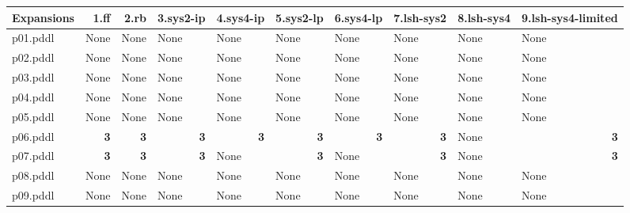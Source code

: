 \documentclass{article}
\begin{document}
\begin{tabular}{@{}lrrrrrrrrr@{}}
Expansions & 1.ff & 2.rb & 3.sys2-ip & 4.sys4-ip & 5.sys2-lp & 6.sys4-lp & 7.lsh-sys2 & 8.lsh-sys4 & 9.lsh-sys4-limited \\
\midrule
p01.pddl & \multicolumn{1}{|l|}{None} & \multicolumn{1}{|l|}{None} & \multicolumn{1}{|l|}{None} & \multicolumn{1}{|l|}{None} & \multicolumn{1}{|l|}{None} & \multicolumn{1}{|l|}{None} & \multicolumn{1}{|l|}{None} & \multicolumn{1}{|l|}{None} & \multicolumn{1}{|l|}{None} \\
p02.pddl & \multicolumn{1}{|l|}{None} & \multicolumn{1}{|l|}{None} & \multicolumn{1}{|l|}{None} & \multicolumn{1}{|l|}{None} & \multicolumn{1}{|l|}{None} & \multicolumn{1}{|l|}{None} & \multicolumn{1}{|l|}{None} & \multicolumn{1}{|l|}{None} & \multicolumn{1}{|l|}{None} \\
p03.pddl & \multicolumn{1}{|l|}{None} & \multicolumn{1}{|l|}{None} & \multicolumn{1}{|l|}{None} & \multicolumn{1}{|l|}{None} & \multicolumn{1}{|l|}{None} & \multicolumn{1}{|l|}{None} & \multicolumn{1}{|l|}{None} & \multicolumn{1}{|l|}{None} & \multicolumn{1}{|l|}{None} \\
p04.pddl & \multicolumn{1}{|l|}{None} & \multicolumn{1}{|l|}{None} & \multicolumn{1}{|l|}{None} & \multicolumn{1}{|l|}{None} & \multicolumn{1}{|l|}{None} & \multicolumn{1}{|l|}{None} & \multicolumn{1}{|l|}{None} & \multicolumn{1}{|l|}{None} & \multicolumn{1}{|l|}{None} \\
p05.pddl & \multicolumn{1}{|l|}{None} & \multicolumn{1}{|l|}{None} & \multicolumn{1}{|l|}{None} & \multicolumn{1}{|l|}{None} & \multicolumn{1}{|l|}{None} & \multicolumn{1}{|l|}{None} & \multicolumn{1}{|l|}{None} & \multicolumn{1}{|l|}{None} & \multicolumn{1}{|l|}{None} \\
p06.pddl & \textbf{3} & \textbf{3} & \textbf{3} & \textbf{3} & \textbf{3} & \textbf{3} & \textbf{3} & \multicolumn{1}{|l|}{None} & \textbf{3} \\
p07.pddl & \textbf{3} & \textbf{3} & \textbf{3} & \multicolumn{1}{|l|}{None} & \textbf{3} & \multicolumn{1}{|l|}{None} & \textbf{3} & \multicolumn{1}{|l|}{None} & \textbf{3} \\
p08.pddl & \multicolumn{1}{|l|}{None} & \multicolumn{1}{|l|}{None} & \multicolumn{1}{|l|}{None} & \multicolumn{1}{|l|}{None} & \multicolumn{1}{|l|}{None} & \multicolumn{1}{|l|}{None} & \multicolumn{1}{|l|}{None} & \multicolumn{1}{|l|}{None} & \multicolumn{1}{|l|}{None} \\
p09.pddl & \multicolumn{1}{|l|}{None} & \multicolumn{1}{|l|}{None} & \multicolumn{1}{|l|}{None} & \multicolumn{1}{|l|}{None} & \multicolumn{1}{|l|}{None} & \multicolumn{1}{|l|}{None} & \multicolumn{1}{|l|}{None} & \multicolumn{1}{|l|}{None} & \multicolumn{1}{|l|}{None} \\

\end{tabular}
\end{document}
